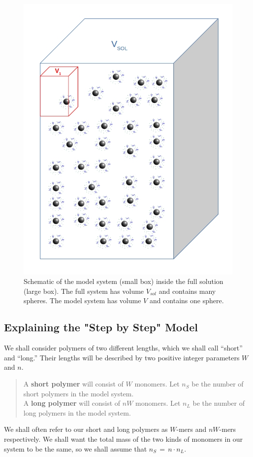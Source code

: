 \documentclass[journal=mamobx,manuscript=article]{achemso}
\begin{document}
\begin{figure}[H] 
\includegraphics[scale=0.5]{fig7.jpg}
\caption{Schematic of the model system (small box)
inside the full solution (large box). The full system
has volume $V_{sol}$ and contains many spheres.  The model
system has volume $V$ and contains one sphere.}
\label{figure 1}
\end{figure}

\subsection{Explaining the "Step by Step" Model}

We shall consider polymers of two different lengths, which we shall call ``short'' and ``long.''  Their lengths
will be described by two positive integer parameters $W$ and $n$.

\begin{verse}
A \textbf{short polymer} will consist of $W$ monomers.  
Let $n_S$ be the number of short polymers in the model system. 
\\
A \textbf{long polymer} will consist of $nW$ monomers.  
Let $n_L$ be the number of long polymers in the model system. 
\end{verse}
We shall often refer to our short and long polymers as $W$-mers and $nW$-mers respectively.
We shall want the total mass of the two kinds of monomers in our system to be the same, so we 
shall assume that $n_S \,=\, n\cdot n_L$.
\end{document}
